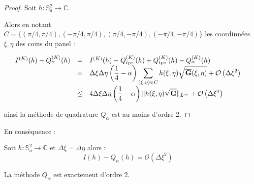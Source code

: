 \begin{proof}
Soit $h: \mathbb{S}_a^2 \rightarrow \mathbb{C}$.

Alors en notant $C=\{(\pi/4,\pi/4),(-\pi/4,\pi/4),(\pi/4,-\pi/4),(-\pi/4,-\pi/4) \}$ les coordinnées $\xi,\eta$ des coins du panel :

\begin{equation*}
\begin{array}{rcl}
I^{(K)}(h) - Q^{(K)}_{\alpha}(h) & = & I^{(K)}(h) - Q^{(K)}_{tpz}(h) + Q^{(K)}_{tpz}(h) - Q^{(K)}_{\alpha}(h)\\
                                 & = & \Delta \xi \Delta \eta \left( \dfrac{1}{4}-\alpha \right)\displaystyle\sum\limits_{(\xi,\eta)\in C} h(\xi, \eta) \sqrt{\overline{\mathbf{G}}(\xi,\eta)} + \mathcal{O}\left(\Delta \xi^2 \right)\\
                                 & \leq &   4 \Delta \xi \Delta \eta \left( \dfrac{1}{4}-\alpha \right) \| h(\xi, \eta) \sqrt{\overline{\mathbf{G}}} \|_{L^{\infty}} + \mathcal{O}\left(\Delta \xi^2 \right)
\end{array}
\end{equation*}

ainsi la méthode de quadrature $Q_{\alpha}$ est au moins d'ordre 2.
\end{proof}

En consèquence :

\begin{proposition}
Soit $h: \mathbb{S}_a^2 \rightarrow \mathbb{C}$ et $\Delta \xi = \Delta \eta$ alors :
\begin{equation}
I(h) - Q_{\alpha}(h) = \mathcal{O} \left( \Delta \xi^2 \right)
\end{equation}
\end{proposition}

\begin{proposition}
La méthode $Q_{\alpha}$ est exactement d'ordre 2.
\end{proposition}


